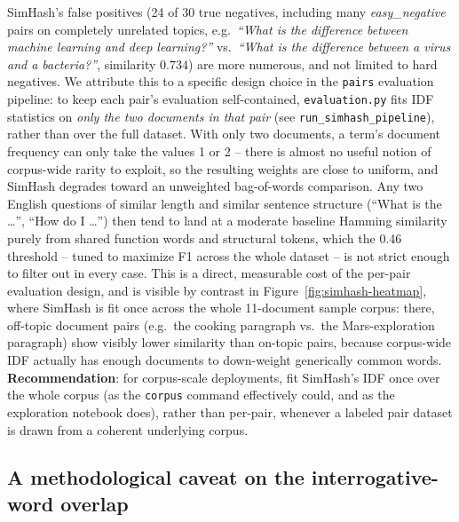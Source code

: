 \documentclass[11pt]{article}
\begin{document}
SimHash's false positives (24 of 30 true negatives, including many \emph{easy\_negative} pairs on
completely unrelated topics, e.g.\ \emph{``What is the difference between machine learning and deep
learning?''} vs.\ \emph{``What is the difference between a virus and a bacteria?''}, similarity $0.734$)
are more numerous, and not limited to hard negatives. We attribute this to a specific design choice in the
\texttt{pairs} evaluation pipeline: to keep each pair's evaluation self-contained, \verb|evaluation.py|
fits IDF statistics on \emph{only the two documents in that pair} (see
\verb|run_simhash_pipeline|), rather than over the full dataset. With only two documents, a
term's document frequency can only take the values 1 or 2 -- there is almost no useful notion of
corpus-wide rarity to exploit, so the resulting weights are close to uniform, and SimHash degrades toward
an unweighted bag-of-words comparison. Any two English questions of similar length and similar sentence
structure (``What is the \ldots'', ``How do I \ldots'') then tend to land at a moderate baseline Hamming
similarity purely from shared function words and structural tokens, which the 0.46 threshold -- tuned to
maximize F1 across the whole dataset -- is not strict enough to filter out in every case. This is a direct,
measurable cost of the per-pair evaluation design, and is visible by contrast in
Figure~\ref{fig:simhash-heatmap}, where SimHash is fit once across the whole 11-document sample corpus:
there, off-topic document pairs (e.g.\ the cooking paragraph vs.\ the Mars-exploration paragraph) show
visibly lower similarity than on-topic pairs, because corpus-wide IDF actually has enough documents to
down-weight generically common words. \textbf{Recommendation}: for corpus-scale deployments, fit SimHash's
IDF once over the whole corpus (as the \texttt{corpus} command effectively could, and as the exploration
notebook does), rather than per-pair, whenever a labeled pair dataset is drawn from a coherent underlying
corpus.

\subsection{A methodological caveat on the interrogative-word overlap}
\end{document}
